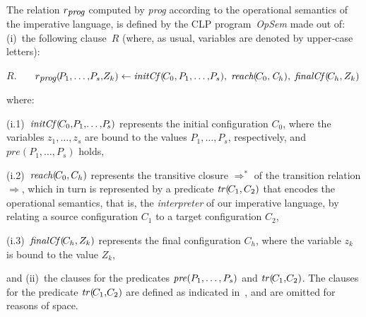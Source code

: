 \documentclass[english]{tlp}
\begin{document}
The relation $r_{\textit{\small prog}}$
computed by \textit{prog} according to the operational semantics of 
the imperative language, is defined by the CLP 
program~\textit{OpSem} made out of: (i)~the following clause~$R$
(where, as usual, variables are denoted by upper-case letters):

\noindent
$R$.~~~ $r_{\textit{\small prog}}(\!P_1,\ldots,\!P_s,\!Z_k) 
\leftarrow \textit{initCf\/}
(\!C_0,P_1,\ldots,\!P_s),\; \textit{reach}(\!C_0,\textit{C}_h),\; \textit{finalCf\/}(\!C_h,Z_k)$

\noindent
where:

\noindent\hangindent=5mm
(i.1)~$\textit{initCf\/}(\!C_0,\!P_1,\!\ldots,\!P_{\!s})$
represents the initial configuration $\textit{C}_0$, where the variables
$z_1,\!\ldots\!,\!z_s$ are bound to the values $P_1,\!\ldots\!,\!P_s$, respectively,
and $\textit{pre}(\!P_1,\!\ldots\!,\!P_s)$ holds,

\noindent\hangindent=5mm
(i.2)~$\textit{reach\/}(\!C_0,C_h)$ represents the transitive closure
$\Longrightarrow ^*$ of the transition relation $\Longrightarrow$, 
which in turn is represented by a predicate $\textit{tr\/}(\!C_1,C_2)$ 
that encodes the operational semantics, that is, the
{\it interpreter} of our imperative language,
by relating a source configuration $C_{1}$ to a target configuration $C_{2}$,

\noindent\hangindent=5mm
(i.3)~$\textit{finalCf\/}(\!C_h,Z_k)$ represents the final configuration 
$\textit{C}_h$, where the variable $z_k$ is bound to the value $Z_k$,

\noindent
and (ii)~the clauses for the predicates 
$\textit{pre\/}(P_1,\ldots,P_s)$ and 
$\textit{tr\/}(\!C_1,\!C_2)$. The 
clauses for the predicate $\textit{tr\/}(\!C_{1},\!C_{2})$ are defined 
as indicated in~\cite{De&14c},
and are omitted for reasons of space.
\end{document}
